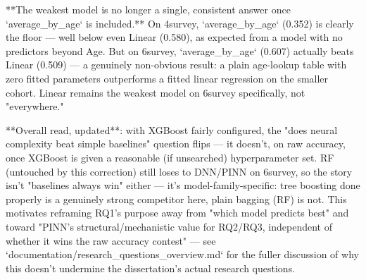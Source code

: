 **The weakest model is no longer a single, consistent answer once `average_by_age` is included.**
On 4survey, `average_by_age` (0.352) is clearly the floor — well below even Linear (0.580), as
expected from a model with no predictors beyond Age. But on 6survey, `average_by_age` (0.607)
actually beats Linear (0.509) — a genuinely non-obvious result: a plain age-lookup table with zero
fitted parameters outperforms a fitted linear regression on the smaller cohort. Linear remains the
weakest model on 6survey specifically, not "everywhere."

**Overall read, updated**: with XGBoost fairly configured, the "does neural complexity beat simple
baselines" question flips — it doesn't, on raw accuracy, once XGBoost is given a reasonable
(if unsearched) hyperparameter set. RF (untouched by this correction) still loses to DNN/PINN on
6survey, so the story isn't "baselines always win" either — it's model-family-specific: tree
boosting done properly is a genuinely strong competitor here, plain bagging (RF) is not. This
motivates reframing RQ1's purpose away from "which model predicts best" and toward "PINN's
structural/mechanistic value for RQ2/RQ3, independent of whether it wins the raw accuracy contest"
— see `documentation/research_questions_overview.md` for the fuller discussion of why this doesn't
undermine the dissertation's actual research questions.
